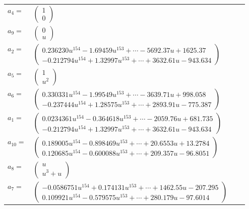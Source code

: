 \documentclass[1p]{elsarticle_modified}
\theoremstyle{definition}
\begin{document}
\begin{tabular}{m{7pt} m{180pt} m{7pt} m{180pt} }
\flushright $a_{4}=$&$\begin{pmatrix}1\\0\end{pmatrix}$ \\
\flushright $a_{9}=$&$\begin{pmatrix}0\\u\end{pmatrix}$ \\
\flushright $a_{2}=$&$\begin{pmatrix}0.236230 u^{154}-1.69459 u^{153}+\cdots-5692.37 u+1625.37\\-0.212794 u^{154}+1.32997 u^{153}+\cdots+3632.61 u-943.634\end{pmatrix}$ \\
\flushright $a_{5}=$&$\begin{pmatrix}1\\u^2\end{pmatrix}$ \\
\flushright $a_{6}=$&$\begin{pmatrix}0.330331 u^{154}-1.99549 u^{153}+\cdots-3639.71 u+998.058\\-0.237444 u^{154}+1.28575 u^{153}+\cdots+2893.91 u-775.387\end{pmatrix}$ \\
\flushright $a_{1}=$&$\begin{pmatrix}0.0234361 u^{154}-0.364618 u^{153}+\cdots-2059.76 u+681.735\\-0.212794 u^{154}+1.32997 u^{153}+\cdots+3632.61 u-943.634\end{pmatrix}$ \\
\flushright $a_{10}=$&$\begin{pmatrix}0.189005 u^{154}-0.898469 u^{153}+\cdots+20.6553 u+13.2784\\0.120685 u^{154}-0.600088 u^{153}+\cdots+209.357 u-96.8051\end{pmatrix}$ \\
\flushright $a_{8}=$&$\begin{pmatrix}u\\u^3+u\end{pmatrix}$ \\
\flushright $a_{7}=$&$\begin{pmatrix}-0.0586751 u^{154}+0.174131 u^{153}+\cdots+1462.55 u-207.295\\0.109921 u^{154}-0.579575 u^{153}+\cdots+280.179 u-97.6014\end{pmatrix}$ \\

\end{tabular}
\end{document}
